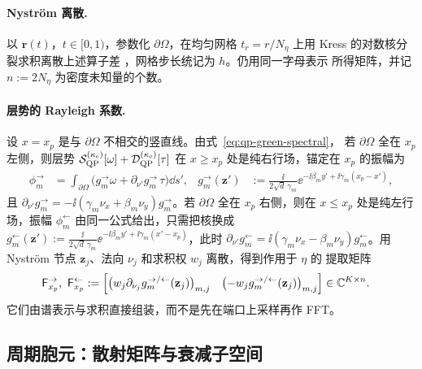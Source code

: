 \paragraph{Nystr\"om 离散.}
以 $\boldsymbol r(t)$，$t\in[0,1)$，参数化 $\partial\Omega$，在均匀网格
$t_r=r/N_\eta$ 上用 Kress 的对数核分裂求积离散上述算子差
\cite{Kress1991,HaoBarnettMartinssonYoung2014}，网格步长统记为 $h$。仍用同一字母表示
所得矩阵，并记 $n:=2N_\eta$ 为密度未知量的个数。

\paragraph{层势的 Rayleigh 系数.}
设 $x=x_p$ 是与 $\partial\Omega$ 不相交的竖直线。由式~\eqref{eq:qp-green-spectral}，
若 $\partial\Omega$ 全在 $x_p$ 左侧，则层势
$\mathcal S^{(\kappa_{\mathrm e})}_{\mathrm{QP}}[\omega]+\mathcal D^{(\kappa_{\mathrm e})}_{\mathrm{QP}}[\tau]$
在 $x\geq x_p$ 处是纯右行场，锚定在 $x_p$ 的振幅为
\begin{align}
  \phi_m^{\rightarrow}
  &=\int_{\partial\Omega}\bigl(g_m^{\rightarrow}\omega
    +\partial_{\nu'}g_m^{\rightarrow}\,\tau\bigr)\dd s',
  &g_m^{\rightarrow}(\mathbf z')
  &:=\frac{\ii}{2\sqrt d\,\gamma_m}
    \ee^{-\ii\beta_my'+\ii\gamma_m(x_p-x')},
  \label{eq:rayleigh-coefficient-right}
\end{align}
且 $\partial_{\nu'}g_m^{\rightarrow}=-\ii(\gamma_m\nu_x+\beta_m\nu_y)g_m^{\rightarrow}$。若
$\partial\Omega$ 全在 $x_p$ 右侧，则在 $x\leq x_p$ 处是纯左行场，振幅 $\phi_m^{\leftarrow}$
由同一公式给出，只需把核换成
$g_m^{\leftarrow}(\mathbf z'):=\frac{\ii}{2\sqrt d\,\gamma_m}
\ee^{-\ii\beta_my'+\ii\gamma_m(x'-x_p)}$，此时
$\partial_{\nu'}g_m^{\leftarrow}=\ii(\gamma_m\nu_x-\beta_m\nu_y)g_m^{\leftarrow}$。用
Nystr\"om 节点 $\mathbf z_j$、法向 $\nu_j$ 和求积权 $w_j$ 离散，得到作用于 $\eta$ 的
提取矩阵
\begin{align}
  \mathsf F^{\rightarrow}_{x_p},\ \mathsf F^{\leftarrow}_{x_p}
  &:=\Bigl[\bigl(w_j\partial_{\nu_j}g_m^{\rightarrow/\leftarrow}(\mathbf z_j)\bigr)_{m,j}
    \quad\bigl(-w_jg_m^{\rightarrow/\leftarrow}(\mathbf z_j)\bigr)_{m,j}\Bigr]
  \in\mathbb{C}^{K\times n}.
  \label{eq:farfield-extractors}
\end{align}
它们由谱表示与求积直接组装，而不是先在端口上采样再作 FFT。

\subsection{周期胞元：散射矩阵与衰减子空间}
\label{subsec:lead-cells}

